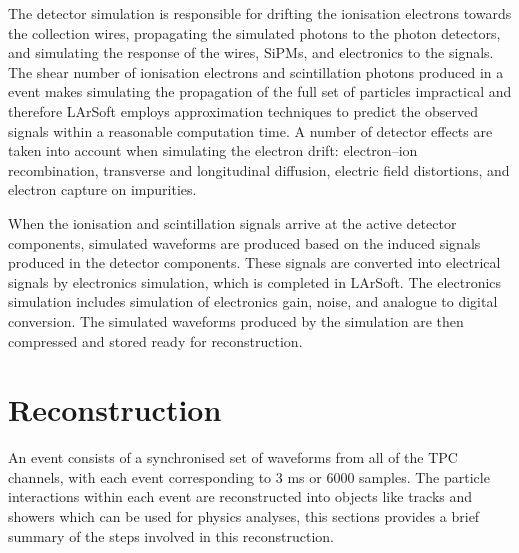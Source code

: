 The detector simulation is responsible for drifting the ionisation electrons 
towards the collection wires, propagating the simulated photons to the photon 
detectors, and simulating the response of the wires, SiPMs, and electronics to 
the signals. The shear number of ionisation electrons and scintillation 
photons produced in a \protodune{} event makes simulating the propagation of 
the full set of particles impractical and therefore LArSoft employs 
approximation techniques to predict the observed signals within a reasonable 
computation time. A number of detector effects are taken into account when 
simulating the electron drift: electron--ion recombination, transverse and 
longitudinal diffusion, electric field distortions, and electron capture on 
impurities. 

When the ionisation and scintillation signals arrive at the active detector 
components, simulated waveforms are produced based on the induced signals 
produced in the detector components. These signals are converted into 
electrical signals by electronics simulation, which is completed in LArSoft. 
The electronics simulation includes simulation of electronics gain, noise, 
and analogue to digital conversion. The simulated waveforms produced by the 
\protodune{} simulation are then compressed and stored ready for reconstruction.

\section{Reconstruction} \label{sec:reconstruction}


An event consists of a synchronised set of waveforms from all of the TPC 
channels, with each event corresponding to 3 ms or 6000 samples. The particle
interactions within each event are reconstructed into objects like tracks and
showers which can be used for physics analyses, this sections provides a brief 
summary of the steps involved in this reconstruction.

